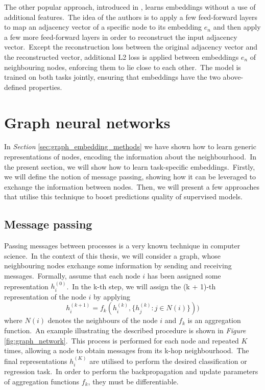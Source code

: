 \documentclass[longabstract, english, mgr]{iithesis}
\theoremstyle{default_theorem_style}\newtheorem{theorem}{Theorem}
\theoremstyle{default_theorem_style}\newtheorem{definition}{Definition}
\begin{document}
\noindent The other popular approach, introduced in \cite{sdne}, learns embeddings without a use of additional
features.\ The idea of the authors is to apply a few feed-forward layers to map an adjacency vector of a specific node
to its embedding $e_n$ and then apply a few more feed-forward layers in order to reconstruct the input adjacency
vector.\ Except the reconstruction loss between the original adjacency vector and the reconstructed vector, additional
L2 loss is applied between embeddings $e_n$ of neighbouring nodes, enforcing them to lie close to each other.\ The model
is trained on both tasks jointly, ensuring that embeddings have the two above-defined properties.

\section{Graph neural networks}\label{sec:graph_neural_networks}

In \textit{Section} \ref{sec:graph_embedding_methods} we have shown how to learn generic representations of nodes,
encoding the information about the neighbourhood.\ In the present section, we will show how to learn task-specific
embeddings.\ Firstly, we will define the notion of message passing, showing how it can be leveraged to exchange the
information between nodes.\ Then, we will present a few approaches that utilise this technique to boost
predictions quality of supervised models.

\subsection{Message passing}

Passing messages between processes is a very known technique in computer science.\ In the context of this thesis, we
will consider a graph, whose neighbouring nodes exchange some information by sending and receiving
messages.\ Formally, assume that each node $i$ has been assigned some representation $h_i^{(0)}$.\ In the k-th
step, we will assign the (k + 1)-th representation of the node $i$ by applying
\begin{equation}\label{eq:message_passing}
h_i^{(k + 1)} = f_k(h_i^{(k)}, \{h_j^{(k)} : j \in N(i)\}))
\end{equation}
where $N(i)$ denotes the neighbours of the node $i$ and $f_k$ is an aggregation function.\ An example illustrating
the described procedure is shown in \textit{Figure} \ref{fig:graph_network}.\ This process is performed
for each node and repeated $K$ times, allowing a node to obtain messages from its k-hop neighbourhood.\ The
final representations $h_i^{(K)}$ are utilised to perform the desired classification or regression task.\ In order to
perform the backpropagation and update parameters of aggregation functions $f_k$, they must be
differentiable.\newline
\end{document}
